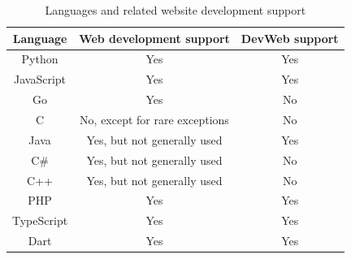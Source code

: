\begin{table}[h]
	\caption{Languages and related website development support}\label{table:language_web_dev}
    \centering
    \begin{tabular}{ccc}
    Language & Web development support & DevWeb support \\\hline
    Python & Yes & Yes \\
    JavaScript & Yes & Yes \\
    Go & Yes & No \\
    C & No, except for rare exceptions & No \\
    Java & Yes, but not generally used & Yes \\
    C\# & Yes, but not generally used & No \\ 
    C++ & Yes, but not generally used & No \\
    PHP & Yes & Yes \\
    TypeScript & Yes & Yes \\
    Dart & Yes & Yes \\
    \end{tabular}
\end{table}